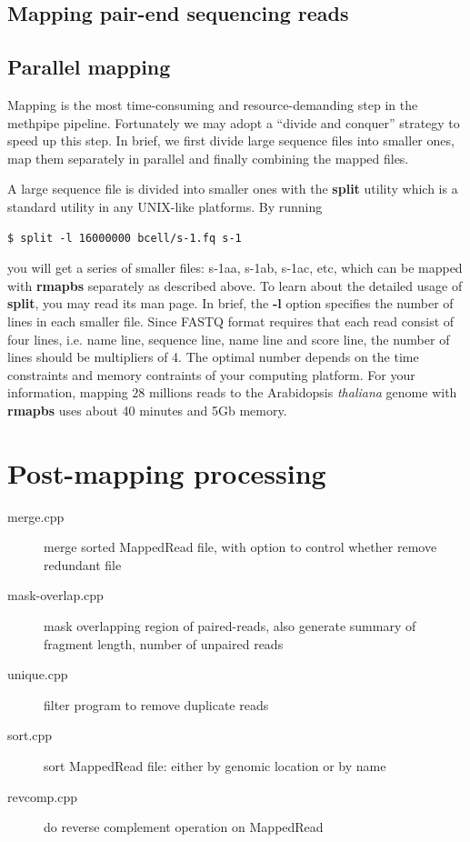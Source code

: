 \documentclass{article}
\begin{document}
\subsection{Mapping pair-end sequencing reads}
\label{sec:mapping-pair-end}



\subsection{Parallel mapping}
\label{sec:parallel-mapping}
Mapping is the most time-consuming and resource-demanding step in the
methpipe pipeline. Fortunately we may adopt a ``divide and conquer''
strategy to speed up this step.  In brief, we first divide large
sequence files into smaller ones, map them separately in parallel and
finally combining the mapped files.

A large sequence file is divided into smaller ones with the
\textbf{split} utility which is a standard utility in any UNIX-like
platforms. By running
\begin{verbatim}
$ split -l 16000000 bcell/s-1.fq s-1
\end{verbatim}
you will get a series of smaller files: s-1aa, s-1ab, s-1ac, etc,
which can be mapped with \textbf{rmapbs} separately as described
above. To learn about the detailed usage of \textbf{split}, you may
read its man page. In brief, the \textbf{-l} option specifies the
number of lines in each smaller file. Since FASTQ format requires that
each read consist of four lines, i.e. name line, sequence line, name
line and score line, the number of lines should be multipliers of
4. The optimal number depends on the time constraints and memory
contraints of your computing platform. For your information, mapping
$28$ millions reads to the Arabidopsis \textit{thaliana} genome with
\textbf{rmapbs} uses about 40 minutes and 5Gb memory. 

\section{Post-mapping processing}
\label{sec:postmapping}

\begin{description}
\item[merge.cpp]
merge sorted MappedRead file, with option to control whether remove redundant file

\item[mask-overlap.cpp]
mask overlapping region of paired-reads, also generate summary of fragment length,
number of unpaired reads

\item[unique.cpp ]
filter program to remove duplicate reads

\item[ sort.cpp ]
sort MappedRead file: either by genomic location or by name

\item[ revcomp.cpp ]
do reverse complement operation on MappedRead

\end{description}
\end{document}
